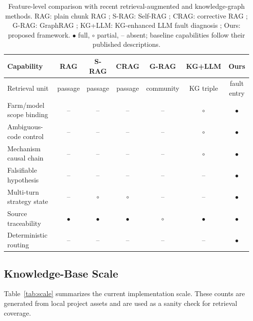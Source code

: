 \documentclass[lettersize,journal]{IEEEtran}
\begin{document}
\begin{table}[htbp]
\caption{Feature-level comparison with recent retrieval-augmented and knowledge-graph methods. RAG: plain chunk RAG \cite{lewis2020rag}; S-RAG: Self-RAG \cite{asai2023selfrag}; CRAG: corrective RAG \cite{yan2024crag}; G-RAG: GraphRAG \cite{edge2024graphrag}; KG+LLM: KG-enhanced LLM fault diagnosis \cite{ma2026fdrkgllm,wang2025wtfaultllm}; Ours: proposed framework. $\bullet$ full, $\circ$ partial, -- absent; baseline capabilities follow their published descriptions.}
\label{tab:comparison}
\centering
\setlength{\tabcolsep}{3pt}
\small
\begin{tabular}{lcccccc}
\toprule
Capability & RAG & S-RAG & CRAG & G-RAG & KG+LLM & Ours \\
\midrule
Retrieval unit & passage & passage & passage & community & KG triple & fault entry \\
Farm/model scope binding & -- & -- & -- & -- & $\circ$ & $\bullet$ \\
Ambiguous-code control & -- & -- & -- & -- & $\circ$ & $\bullet$ \\
Mechanism causal chain & -- & -- & -- & -- & $\circ$ & $\bullet$ \\
Falsifiable hypothesis & -- & -- & -- & -- & -- & $\bullet$ \\
Multi-turn strategy state & -- & $\circ$ & $\circ$ & -- & -- & $\bullet$ \\
Source traceability & $\bullet$ & $\bullet$ & $\bullet$ & $\circ$ & $\bullet$ & $\bullet$ \\
Deterministic routing & -- & -- & -- & -- & -- & $\bullet$ \\
\bottomrule
\end{tabular}
\end{table}

\subsection{Knowledge-Base Scale}
Table~\ref{tab:scale} summarizes the current implementation scale. These counts are generated from local project assets and are used as a sanity check for retrieval coverage.
\end{document}
